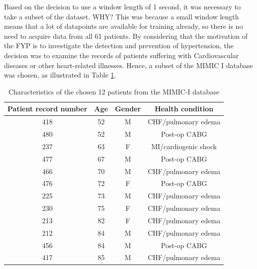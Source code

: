 Based on the decision to use a window length of 1 second, it was necessary to take a subset of the dataset. WHY? 
This was because a small window length means that a lot of datapoints are available for training already, so there 
is no need to acquire data from all 61 patients. By considering that the motivation of the FYP is to investigate the detection and prevention 
of hypertension, the decision was to examine the records of patients suffering with 
Cardiovascular diseases or other heart-related illnesses. Hence, a subset of the MIMIC I database was chosen, as illustrated 
in Table \ref{tabDatasetChosen}.
\begin{table}[H]
    \centering
    \caption{Characteristics of the chosen 12 patients from the MIMIC-I database}
    \label{tabDatasetChosen}
    \begin{tabular}{cccc}
    \hline
    \textbf{Patient record number} & \textbf{Age} & \textbf{Gender} & \textbf{Health condition} \\ \hline
    418 & 52 & M & CHF/pulmonary edema  \\
    480 & 52 & M & Post-op CABG         \\
    237 & 63 & F & MI/cardiogenic shock \\
    477 & 67 & M & Post-op CABG         \\
    466 & 70 & M & CHF/pulmonary edema  \\
    476 & 72 & F & Post-op CABG         \\
    225 & 73 & M & CHF/pulmonary edema  \\
    230 & 75 & F & CHF/pulmonary edema  \\
    213 & 82 & F & CHF/pulmonary edema  \\
    212 & 84 & M & CHF/pulmonary edema  \\
    456 & 84 & M & Post-op CABG         \\ 
    417 & 85 & M & CHF/pulmonary edema \\\hline
    \end{tabular}
\end{table}\noindent 



